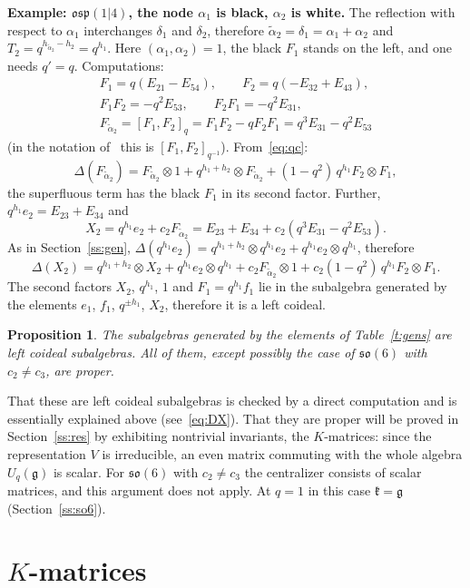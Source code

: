 \documentclass[12pt,a4paper]{article}
\newtheorem{propn}[theorem]{Proposition}
\newcommand{\g}{\mathfrak{g}}
\newcommand{\kk}{\mathfrak{k}}
\newcommand{\so}{\mathfrak{so}}
\newcommand{\osp}{\mathfrak{osp}}
\newcommand{\Uq}{U_q}
\newcommand{\ta}{\tilde\alpha}
\newcommand{\ot}{\otimes}
\begin{document}
\textbf{Example: $\osp(1|4)$, the node $\alpha_1$ is black, $\alpha_2$ is white.} The reflection with respect to $\alpha_1$ interchanges
$\delta_1$ and $\delta_2$, therefore $\ta_2=\delta_1=\alpha_1+\alpha_2$ and $T_2=q^{h_{\ta_2}-h_2}=q^{h_1}$. Here
$(\alpha_1,\alpha_2)=1$, the black $F_1$ stands on the left, and one needs $q'=q$. Computations:
\begin{gather*}
F_1=q(E_{21}-E_{54}),\qquad F_2=q(-E_{32}+E_{43}),\\
F_1F_2=-q^2E_{53},\qquad F_2F_1=-q^2E_{31},\\
F_{\ta_2}=[F_1,F_2]_q=F_1F_2-qF_2F_1=q^3E_{31}-q^2E_{53}
\end{gather*}
(in the notation of~\cite{AMS} this is $[F_1,F_2]_{q^{-1}}$). From~\eqref{eq:qc}:
\[
\Delta(F_{\ta_2})=F_{\ta_2}\ot1+q^{h_1+h_2}\ot F_{\ta_2}+(1-q^2)\,q^{h_1}F_2\ot F_1 ,
\]
the superfluous term has the black $F_1$ in its second factor. Further, $q^{h_1}e_2=E_{23}+E_{34}$ and
\[
X_2=q^{h_1}e_2+c_2F_{\ta_2}=E_{23}+E_{34}+c_2(q^3E_{31}-q^2E_{53}).
\]
As in Section~\ref{ss:gen}, $\Delta(q^{h_1}e_2)=q^{h_1+h_2}\ot q^{h_1}e_2+q^{h_1}e_2\ot q^{h_1}$, therefore
\[
\Delta(X_2)=q^{h_1+h_2}\ot X_2+q^{h_1}e_2\ot q^{h_1}+c_2F_{\ta_2}\ot1+c_2(1-q^2)\,q^{h_1}F_2\ot F_1 .
\]
The second factors $X_2$, $q^{h_1}$, $1$ and $F_1=q^{h_1}f_1$ lie in the subalgebra generated by the elements $e_1$, $f_1$, $q^{\pm h_1}$,
$X_2$, therefore it is a left coideal.

\begin{propn}\label{p:coideal}
The subalgebras generated by the elements of Table~\ref{t:gens} are left coideal subalgebras. All of them, except possibly the case of $\so(6)$ with $c_2\neq c_3$, are proper.
\end{propn}
That these are left coideal subalgebras is checked by a direct computation and is essentially explained above (see~\eqref{eq:DX}). That they are proper will be proved in Section~\ref{ss:res} by exhibiting nontrivial invariants, the $K$-matrices: since the representation $V$ is irreducible, an even matrix commuting with the whole algebra $\Uq(\g)$ is scalar. For $\so(6)$ with $c_2\neq c_3$ the centralizer consists of scalar matrices, and this argument does not apply. At $q=1$ in this case $\kk=\g$ (Section~\ref{ss:so6}).


\section{$K$-matrices}\label{s:K}
\end{document}
